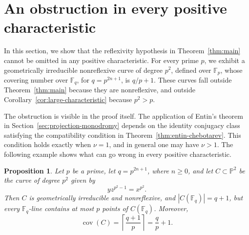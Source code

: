 \documentclass[12pt,reqno]{amsart}
\newtheorem{proposition}[theorem]{Proposition}
\theoremstyle{definition}
\theoremstyle{remark}
\newcommand{\bF}{\mathbb{F}}
\newcommand{\Fp}{\mathbb{F}_p}
\newcommand{\Fq}{\mathbb{F}_q}
\newcommand{\bP}{\mathbb{P}}
\begin{document}
\section{An obstruction in every positive characteristic}\label{sec:obstruction}

In this section, we show that the reflexivity hypothesis in
Theorem~\ref{thm:main} cannot be omitted in any positive characteristic. For every prime $p$, we exhibit a geometrically irreducible nonreflexive curve of degree $p^2$, defined over $\Fp$, whose covering number over $\bF_q$, for $q=p^{2n+1}$, is $q/p+1$. These curves fall outside Theorem~\ref{thm:main} because they are nonreflexive, and outside Corollary~\ref{cor:large-characteristic} because $p^2>p$.

The obstruction is visible in the proof itself. The application of Entin's theorem in Section~\ref{sec:projection-monodromy} depends on the identity conjugacy class satisfying the compatibility condition in Theorem~\ref{thm:entin-chebotarev}. This condition holds exactly when $\nu=1$, and in general one may have $\nu>1$. The following example shows what can go wrong in every positive characteristic.

\begin{proposition}\label{prop:nonreflexive-obstruction}
Let $p$ be a prime, let $q=p^{2n+1}$, where $n\geq 0$, and let
$C\subset\bP^2$ be the curve of degree $p^2$ given by
\[
yz^{p^2-1}=x^{p^2}.
\]
Then $C$ is geometrically irreducible and nonreflexive, and
$|C(\Fq)|=q+1$, but every $\Fq$-line contains at most $p$ points of
$C(\Fq)$. Moreover,
\[
\operatorname{cov}(C)
=
\left\lceil\frac{q+1}{p}\right\rceil
=
\frac{q}{p}+1.
\]
\end{proposition}
\end{document}
